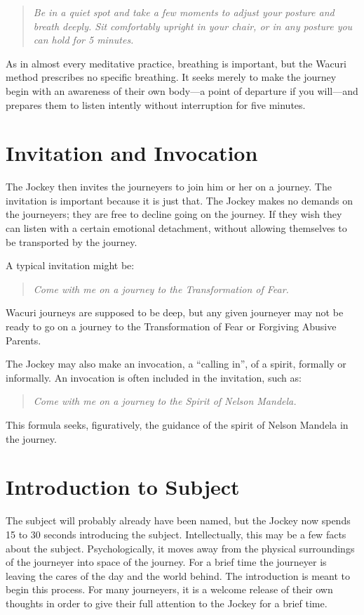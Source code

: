 \documentclass[12pt]{book}
\begin{document}
\begin{quote}{\em Be in a quiet spot and take a few moments to adjust your posture and breath deeply. Sit comfortably upright in your chair, or in any posture you can hold for 5 minutes.}
  \end{quote}
					
As in almost every meditative practice, breathing is important, but the Wacuri method prescribes no specific breathing. It seeks merely to make the journey begin with an awareness of their own body---a point of departure if you will--–and prepares them to listen intently without interruption for five minutes.
					
\section{Invitation and Invocation}
					
The Jockey then invites the journeyers to join him or her on a journey. The invitation is important because it is just that. The Jockey makes no demands on the journeyers; they are free to decline going on the journey. If they wish they can listen with a certain emotional detachment, without allowing themselves to be transported by the journey.
					
A typical invitation might be:
\begin{quote}{\em 
    Come with me on a journey to the Transformation of Fear.}
  \end{quote}
					
Wacuri journeys are supposed to be deep, but any given journeyer may not be ready to go on a journey to the Transformation of Fear
or Forgiving Abusive Parents.
					
The Jockey may also make an invocation, a “calling in”, of a spirit, formally or informally. An invocation is often included in the invitation, such as:

\begin{quote}{\em 
    Come with me on a journey to the Spirit of Nelson Mandela.}
    \end{quote}
					
This formula seeks, figuratively, the guidance of the spirit of Nelson Mandela in the journey.

\section{Introduction to Subject}
					
The subject will probably already have been named, but the Jockey now spends 15 to 30 seconds introducing the subject. Intellectually, this may be a few facts about the subject. Psychologically, it moves away from the physical surroundings of the journeyer into space of the journey. For a brief time the journeyer is leaving the cares of the day and the world behind. The introduction is meant to begin this process. For many journeyers, it is a welcome release of their own thoughts in order to give their full attention to the Jockey for a brief time.
					
\end{document}
